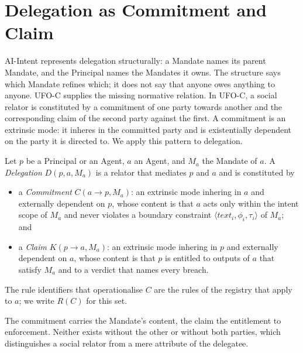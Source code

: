 \documentclass[runningheads]{llncs}
\begin{document}
\section{Delegation as Commitment and Claim}
\label{sec:delegation}

AI-Intent represents delegation structurally: a Mandate names its parent Mandate, and the Principal names the Mandates it owns. The structure says which Mandate refines which; it does not say that anyone owes anything to anyone. UFO-C supplies the missing normative relation. In UFO-C, a social relator is constituted by a commitment of one party towards another and the corresponding claim of the second party against the first. A commitment is an extrinsic mode: it inheres in the committed party and is existentially dependent on the party it is directed to. We apply this pattern to delegation.

\begin{definition}[Delegation]
\label{def:delegation}
Let $p$ be a Principal or an Agent, $a$ an Agent, and $M_a$ the Mandate of $a$. A \emph{Delegation} $D(p, a, M_a)$ is a relator that mediates $p$ and $a$ and is constituted by
\begin{itemize}
  \item a \emph{Commitment} $C(a \to p, M_a)$: an extrinsic mode inhering in $a$ and externally dependent on $p$, whose content is that $a$ acts only within the intent scope of $M_a$ and never violates a boundary constraint $\langle \mathit{text}_i, \phi_i, \tau_i\rangle$ of $M_a$; and
  \item a \emph{Claim} $K(p \to a, M_a)$: an extrinsic mode inhering in $p$ and externally dependent on $a$, whose content is that $p$ is entitled to outputs of $a$ that satisfy $M_a$ and to a verdict that names every breach.
\end{itemize}
The rule identifiers that operationalise $C$ are the rules of the registry that apply to $a$; we write $R(C)$ for this set.
\end{definition}

The commitment carries the Mandate's content, the claim the entitlement to enforcement. Neither exists without the other or without both parties, which distinguishes a social relator from a mere attribute of the delegatee.
\end{document}
